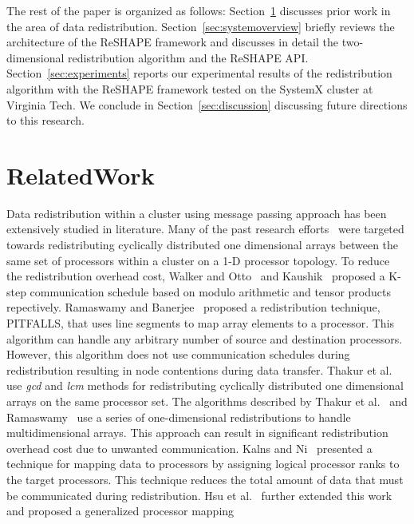 \documentclass[letterpaper]{llncs}
\begin{document}
The rest of the paper is organized as follows: Section~\ref{sec:relatedworks} discusses prior work in the area of data redistribution. 
Section~\ref{sec:systemoverview} briefly reviews the architecture of the ReSHAPE framework and discusses in detail the two-dimensional redistribution algorithm and the ReSHAPE API. 
Section~\ref{sec:experiments} reports our experimental results of the redistribution algorithm with the ReSHAPE framework tested on the SystemX cluster at Virginia Tech. 
We conclude in Section~\ref{sec:discussion} discussing future directions to this research.

\section{RelatedWork}
\label{sec:relatedworks}
Data redistribution within a cluster using message passing approach has been extensively studied in literature.
Many of the past research efforts~\cite{chung} \cite{desprez98scheduling} \cite{Guo}
\cite{Hsu} \cite{kalns} \cite{kaushik} \cite{Lim96}
 \cite{ramaswamy} \cite{thakur2} \cite{thakur1} \cite{walker} were targeted towards redistributing
cyclically distributed one dimensional arrays between the same set of processors within a cluster on a 1-D processor topology.
To reduce the redistribution overhead cost, Walker and Otto~\cite{walker} and Kaushik~\cite{kaushik} proposed a K-step communication 
schedule based on modulo arithmetic and tensor products repectively.
Ramaswamy and Banerjee~\cite{ramaswamy} proposed a redistribution technique,
PITFALLS, that uses line segments to map array elements to a processor.
This algorithm can handle any arbitrary number of source and destination processors.
However, this algorithm does not use communication schedules during
redistribution resulting in node contentions during data transfer.
Thakur et al.~\cite{thakur1}\cite{thakur2} use  \textit{gcd} and \textit{lcm} methods for redistributing cyclically distributed one dimensional arrays
on the same processor set.
The algorithms described
by Thakur et al.~\cite{thakur2} and Ramaswamy~\cite{ramaswamy} use a series of one-dimensional
redistributions  to handle  multidimensional arrays. This approach can result in
 significant redistribution overhead cost due to unwanted communication.
Kalns and Ni~\cite{kalns} presented a technique for mapping data to processors by
assigning logical processor ranks to the target processors. This technique reduces
 the total amount of data that must be communicated during redistribution.
Hsu et al.~\cite{Hsu}
further extended this work and proposed a generalized processor mapping
\end{document}
